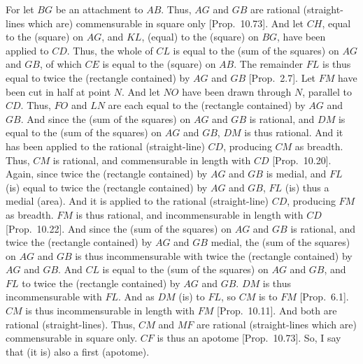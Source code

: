 \begin{Parallel}{}{}
{For let $BG$ be an attachment to $AB$. Thus, $AG$ and $GB$
are rational (straight-lines which are) commensurable in square only
[Prop.~10.73]. And let $CH$, equal to the
(square) on $AG$, and $KL$, (equal) to the (square) on $BG$, have been applied to $CD$. Thus, the whole of $CL$ is equal to the (sum of the
squares) on $AG$ and $GB$, of which $CE$ is equal to the (square) on
$AB$. The remainder $FL$ is thus equal to twice the (rectangle contained)
by $AG$ and $GB$ [Prop.~2.7]. Let $FM$
have been cut in half at point $N$. And let $NO$ have been drawn
through $N$, parallel to $CD$. Thus, $FO$ and $LN$ are each equal to
the (rectangle contained) by $AG$ and $GB$. And since the (sum of the
squares) on $AG$ and $GB$ is rational, and $DM$ is equal to the (sum of the squares) on
$AG$ and $GB$, $DM$ is thus rational. And it has
been applied to the rational (straight-line) $CD$, producing $CM$ as breadth. Thus, $CM$
is rational, and commensurable in length with $CD$ [Prop.~10.20]. Again, since twice the
(rectangle contained) by $AG$ and $GB$ is medial, and $FL$
(is) equal to twice the (rectangle contained) by $AG$ and $GB$, $FL$
(is) thus a medial (area). And it is applied to the rational (straight-line)
$CD$, producing $FM$ as breadth. $FM$ is thus rational, and
incommensurable in  length with $CD$ [Prop.~10.22]. And since the (sum of the
squares) on $AG$ and $GB$ is rational, and twice the (rectangle contained)
by $AG$ and $GB$ medial, the (sum of the squares) on
$AG$ and $GB$ is thus incommensurable with twice the (rectangle
contained) by $AG$ and $GB$. And $CL$ is equal to the (sum of the
squares) on $AG$ and $GB$, and $FL$ to twice the (rectangle contained)
by $AG$ and $GB$. $DM$ is thus incommensurable with $FL$.
And as $DM$ (is) to $FL$, so $CM$ is to $FM$ [Prop.~6.1]. $CM$ is thus incommensurable in length
with $FM$ [Prop.~10.11]. And both are rational 
(straight-lines). Thus, $CM$ and $MF$ are rational (straight-lines
which are) commensurable in square only. $CF$ is thus an apotome
[Prop.~10.73]. So, I say that
(it is) also a first (apotome).

}
\end{Parallel}
